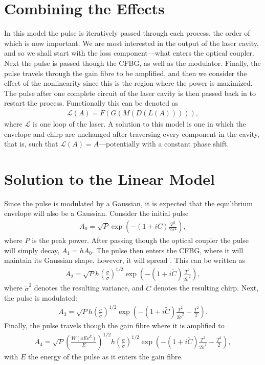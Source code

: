 \section{Combining the Effects}
In this model the pulse is iteratively passed through each process, the order of which is now important. We are most interested in the output of the laser cavity, and so we shall start with the loss component---what enters the optical coupler. Next the pulse is passed though the CFBG, as well as the modulator. Finally, the pulse travels through the gain fibre to be amplified, and then we consider the effect of the nonlinearity since this is the region where the power is maximized. The pulse after one complete circuit of the laser cavity is then passed back in to restart the process. Functionally this can be denoted as
\begin{align*}
	\mathcal{L}(A) = F(G(M(D(L(A))))),
\end{align*}
where $\mathcal{L}$ is one loop of the laser. A solution to this model is one in which the envelope and chirp are unchanged after traversing every component in the cavity, that is, such that $\mathcal{L}(A) = A$---potentially with a constant phase shift.

\section{Solution to the Linear Model}
Since the pulse is modulated by a Gaussian, it is expected that the equilibrium envelope will also be a Gaussian. Consider the initial pulse
\begin{align*}
	A_0 = \sqrt{P} \exp \left( -(1 + iC) \frac{T^2}{2 \sigma^2} \right),
\end{align*}
where $P$ is the peak power. After passing though the optical coupler the pulse will simply decay, $A_1 = h A_0$. The pulse then enters the CFBG, where it will maintain its Gaussian shape, however, it will spread \cite{agrawal2013}. This can be written as
\begin{align*}
A_2 = \sqrt{P} h \left( \frac{\sigma}{\widetilde{\sigma}} \right)^{1/2} \exp \left( -(1 + i \widetilde{C}) \frac{T^2}{2 \widetilde{\sigma}^2} \right),
\end{align*}
where $\widetilde{\sigma}^2$ denotes the resulting variance, and $\widetilde{C}$ denotes the resulting chirp. Next, the pulse is modulated:
\begin{align*}
A_3 = \sqrt{P} h \left( \frac{\sigma}{\widetilde{\sigma}} \right)^{1/2} \exp \left( -(1 + i \widetilde{C}) \frac{T^2}{2 \widetilde{\sigma}^2} - \frac{T^2}{2} \right).
\end{align*}
Finally, the pulse travels though the gain fibre where it is amplified to
\begin{align*}
A_4 = \sqrt{P} \left( \frac{W(a E \textrm{e}^E)}{E} \right)^{1/2} h \left( \frac{\sigma}{\widetilde{\sigma}} \right)^{1/2} \exp \left( -(1 + i \widetilde{C}) \frac{T^2}{2 \widetilde{\sigma}^2} - \frac{T^2}{2} \right),
\end{align*}
with $E$ the energy of the pulse as it enters the gain fibre.

